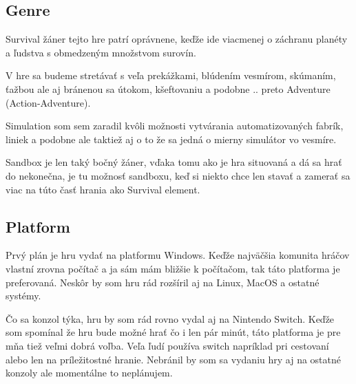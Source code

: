 \documentclass[a4paper,10pt,slovak]{article}
\begin{document}
\subsection*{Genre}
Survival žáner tejto hre patrí oprávnene, keďže ide viacmenej o záchranu planéty a ľudstva s obmedzeným množstvom surovín. 

V hre sa budeme stretávať s veľa prekážkami, blúdením vesmírom, skúmaním, ťažbou ale aj bránenou sa útokom, kšeftovaniu a podobne .. preto Adventure (Action-Adventure). 

Simulation som sem zaradil kvôli možnosti vytvárania automatizovaných fabrík, liniek a podobne ale taktiež aj o to že sa jedná o mierny simulátor vo vesmíre. 

Sandbox je len taký bočný žáner, vďaka tomu ako je hra situovaná a dá sa hrať do nekonečna, je tu možnosť sandboxu, keď si niekto chce len stavať a zamerať sa viac na túto časť hrania ako Survival element.

\subsection*{Platform}
Prvý plán je hru vydať na platformu Windows. Keďže najväčšia komunita hráčov vlastní zrovna počítač a ja sám mám bližšie k počítačom, tak táto platforma je preferovaná. Neskôr by som hru rád rozšíril aj na Linux, MacOS a ostatné systémy. 

Čo sa konzol týka, hru by som rád rovno vydal aj na Nintendo Switch. Keďže som spomínal že hru bude možné hrať čo i len pár minút, táto platforma je pre mňa tiež veľmi dobrá voľba. Veľa ľudí používa switch napríklad pri cestovaní alebo len na príležitostné hranie. 
Nebránil by som sa vydaniu hry aj na ostatné konzoly ale momentálne to neplánujem. 
\end{document}
